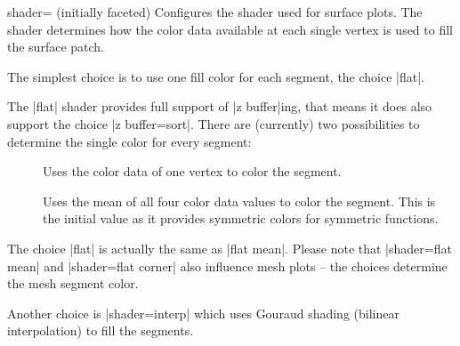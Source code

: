 \begin{pgfplotskey}{shader= (initially faceted)}
	Configures the shader used for surface plots. The shader determines how the color data available at each single vertex is used to fill the surface patch.

	The simplest choice is to use one fill color for each segment, the choice |flat|.

\pgfplotsexpensiveexample
\begin{codeexample}[]
\end{codeexample}

	\noindent The |flat| shader provides full support of |z buffer|ing, that means it does also support the choice |z buffer=sort|. There are (currently) two possibilities to determine the single color for every segment:
	\begin{description}
		\item[] Uses the color data of one vertex to color the segment.

		\item[] Uses the mean of all four color data values to color the segment. This is the initial value as it provides symmetric colors for symmetric functions.
	\end{description}
	The choice |flat| is actually the same as |flat mean|. Please note that |shader=flat mean| and |shader=flat corner| also influence mesh plots -- the choices determine the mesh segment color.

	Another choice is |shader=interp| which uses Gouraud shading (bilinear interpolation) to fill the segments. 

\pgfplotsexpensiveexample
\begin{codeexample}[]
\end{codeexample}


\end{pgfplotskey}

